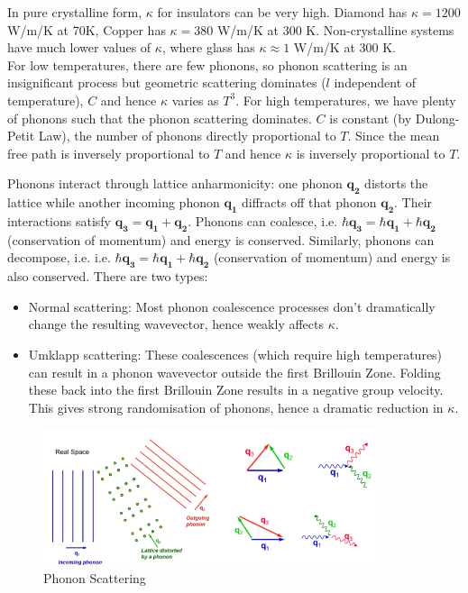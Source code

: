 \documentclass[a4paper]{article}
\begin{document}
\begin{Note}
In pure crystalline form, $\kappa$ for insulators can be very high. Diamond has $\kappa=1200$ W/m/K at 70K, Copper has $\kappa=380$ W/m/K at 300 K. Non-crystalline systems have much lower values of $\kappa$, where glass has $\kappa\approx1$ W/m/K at 300 K.\\[5pt]
For low temperatures, there are few phonons, so phonon scattering is an insignificant process but geometric scattering dominates ($l$ independent of temperature), $C$ and hence $\kappa$ varies as $T^3$. For high temperatures, we have plenty of phonons such that the phonon scattering dominates. $C$ is constant (by Dulong-Petit Law), the number of phonons directly proportional to $T$. Since the mean free path is inversely proportional to $T$ and hence $\kappa$ is inversely proportional to $T$.
\end{Note}
\begin{Note}
Phonons interact through lattice anharmonicity: one phonon $\mathbf{q_2}$ distorts the lattice while another incoming phonon $\mathbf{q_1}$ diffracts off that phonon $\mathbf{q_2}$. Their interactions satisfy $\mathbf{q_3}=\mathbf{q_1}+\mathbf{q_2}$. Phonons can coalesce, i.e. $\hbar\mathbf{q_3}=\hbar\mathbf{q_1}+\hbar\mathbf{q_2}$ (conservation of momentum) and energy is conserved. Similarly, phonons can decompose, i.e. i.e. $\hbar\mathbf{q_3}=\hbar\mathbf{q_1}+\hbar\mathbf{q_2}$ (conservation of momentum) and energy is also conserved. There are two types:
\begin{itemize}
\item Normal scattering: Most phonon coalescence processes don't dramatically change the resulting wavevector, hence weakly affects $\kappa$.
\item Umklapp scattering: These coalescences (which require high temperatures) can result in a phonon wavevector outside the first Brillouin Zone. Folding these back into the first Brillouin Zone results in a negative group velocity. This gives strong randomisation of phonons, hence a dramatic reduction in $\kappa$.
\end{itemize}
\end{Note}
\begin{figure}[H]
    \centering
    \includegraphics[width=\linewidth,height=4cm]{phononscattering.PNG}
    \caption{Phonon Scattering}
\end{figure}
\newpage
\end{document}
